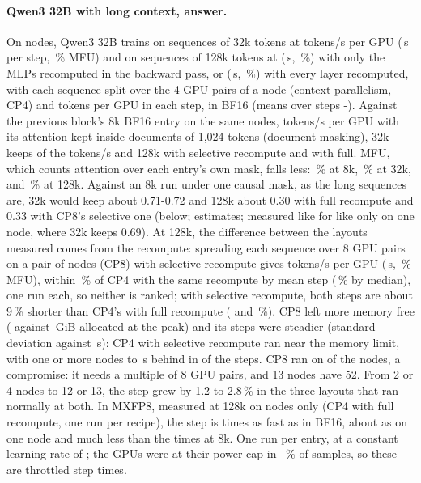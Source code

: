 \paragraph{Qwen3 32B with long context, answer.} On \TriQwCpNodesThirtyTwo{} nodes, Qwen3 32B trains on sequences of 32k tokens at \TriQwCpTokThirtyTwo{} tokens/s per GPU (\TriQwCpStepThirtyTwo\,s per step, \TriQwCpMfuThirtyTwo\,\% MFU) and on sequences of 128k tokens at \TriQwCpTokCpFourSel{} (\TriQwCpStepCpFourSel\,s, \TriQwCpMfuCpFourSel\,\%) with only the MLPs recomputed in the backward pass, or \TriQwCpTokCpFour{} (\TriQwCpStepCpFour\,s, \TriQwCpMfuCpFour\,\%) with every layer recomputed, with each sequence split over the 4 GPU pairs of a node (context parallelism, CP4) and \TriQwCpTokGpu{} tokens per GPU in each step, in BF16 (means over steps \TriQwCpFrom-\TriQwCpSteps). Against the previous block's 8k BF16 entry on the same nodes, \TriQwCpTokRef{} tokens/s per GPU with its attention kept inside documents of 1,024 tokens (document masking), 32k keeps \TriQwCpRatioThirtyTwo{} of the tokens/s and 128k \TriQwCpRatioCpFourSel{} with selective recompute and \TriQwCpRatioCpFour{} with full. MFU, which counts attention over each entry's own mask, falls less: \TriQwCpMfuRef\,\% at 8k, \TriQwCpMfuThirtyTwo\,\% at 32k, \TriQwCpMfuCpFourSel{} and \TriQwCpMfuCpFour\,\% at 128k. Against an 8k run under one causal mask, as the long sequences are, 32k would keep about 0.71-0.72 and 128k about 0.30 with full recompute and 0.33 with CP8's selective one (below; estimates; measured like for like only on one node, where 32k keeps 0.69). At 128k, the difference between the layouts measured comes from the recompute: spreading each sequence over 8 GPU pairs on a pair of nodes (CP8) with selective recompute gives \TriQwCpTokCpEight{} tokens/s per GPU (\TriQwCpStepCpEight\,s, \TriQwCpMfuCpEight\,\% MFU), within \TriQwCpSelEight\,\% of CP4 with the same recompute by mean step (\TriQwCpSelEightMed\,\% by median), one run each, so neither is ranked; with selective recompute, both steps are about 9\,\% shorter than CP4's with full recompute (\TriQwCpSelShorter{} and \TriQwCpEightShorter\,\%). CP8 left more memory free (\TriQwCpMemCpEight{} against \TriQwCpMemCpFourSel\,GiB allocated at the peak) and its steps were steadier (standard deviation \TriQwCpSdCpEight{} against \TriQwCpSdCpFourSel\,s): CP4 with selective recompute ran near the memory limit, with one or more nodes \TriQwCpBehindLo{} to \TriQwCpBehindHi\,s behind in \TriQwCpSlowSteps{} of the \TriQwCpMeasured{} steps. CP8 ran on \TriQwCpNodesCpEight{} of the \TriQwCpNodesThirtyTwo{} nodes, a compromise: it needs a multiple of 8 GPU pairs, and 13 nodes have 52. From 2 or 4 nodes to 12 or 13, the step grew by 1.2 to 2.8\,\% in the three layouts that ran normally at both. In MXFP8, measured at 128k on \TriQwCpMxNodes{} nodes only (CP4 with full recompute, one run per recipe), the step is \TriQwCpMxSpeedup{} times as fast as in BF16, about as on one node and much less than the \TriQwFpFourSpMxBf{} times at 8k. One run per entry, at a constant learning rate of \TriQwCpLr; the GPUs were at their power cap in \TriQwCpCapLo-\TriQwCpCapHi\,\% of samples, so these are throttled step times.

